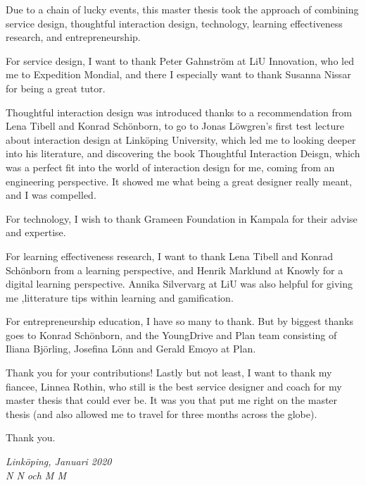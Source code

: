 \begin{acknowledgments}

  Due to a chain of lucky events, this master thesis took the approach of combining service design, thoughtful interaction design, technology, learning effectiveness research, and entrepreneurship.

For service design, I want to thank Peter Gahnström at LiU Innovation, who led me to Expedition Mondial, and there I especially want to thank Susanna Nissar for being a great tutor.

Thoughtful interaction design was introduced thanks to a recommendation from Lena Tibell and Konrad Schönborn, to go to Jonas Löwgren's first test lecture about interaction design at Linköping University, which led me to looking deeper into his literature, and discovering the book Thoughtful Interaction Deisgn, which was a perfect fit into the world of interaction design for me, coming from an engineering perspective. It showed me what being a great designer really meant, and I was compelled.

For technology, I wish to thank Grameen Foundation in Kampala for their advise and expertise.

For learning effectiveness research, I want to thank Lena Tibell and Konrad Schönborn from a learning perspective, and Henrik Marklund at Knowly for a digital learning perspective. Annika Silvervarg at LiU was also helpful for giving me ,litterature tips within learning and gamification.

For entrepreneurship education, I have so many to thank. But by biggest thanks goes to Konrad Schönborn, and the YoungDrive and Plan team consisting of Iliana Björling, Josefina Lönn and Gerald Emoyo at Plan.

Thank you for your contributions! Lastly but not least, I want to thank my fiancee, Linnea Rothin, who still is the best service designer and coach for my master thesis that could ever be. It was you that put me right on the master thesis (and also allowed me to travel for three months across the globe).

Thank you.


  \addvspace{1em}
  \begin{flushright}
    \textit{%
      Linköping, Januari 2020\\
      N N och M M%
    }
  \end{flushright}
\end{acknowledgments}
